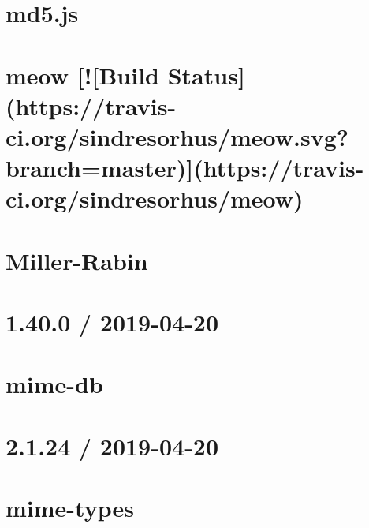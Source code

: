 \documentclass[twoside]{book}
\newcommand{\+}{\discretionary{\mbox{\scriptsize$\hookleftarrow$}}{}{}}
\begin{document}
\chapter{md5.\+js}
\label{md_dsmacc_examples_DRmerge_node_modules_md5_8js_README}

\chapter{meow \mbox{[}!\mbox{[}Build Status\mbox{]}(https\+://travis-\/ci.org/sindresorhus/meow.svg?branch=master)\mbox{]}(https\+://travis-\/ci.org/sindresorhus/meow)}
\label{md_dsmacc_examples_DRmerge_node_modules_meow_readme}

\chapter{Miller-\/\+Rabin}
\label{md_dsmacc_examples_DRmerge_node_modules_miller-rabin_README}

\chapter{1.40.0 / 2019-\/04-\/20}
\label{md_dsmacc_examples_DRmerge_node_modules_mime-db_HISTORY}

\chapter{mime-\/db}
\label{md_dsmacc_examples_DRmerge_node_modules_mime-db_README}

\chapter{2.1.24 / 2019-\/04-\/20}
\label{md_dsmacc_examples_DRmerge_node_modules_mime-types_HISTORY}

\chapter{mime-\/types}
\label{md_dsmacc_examples_DRmerge_node_modules_mime-types_README}

\end{document}
